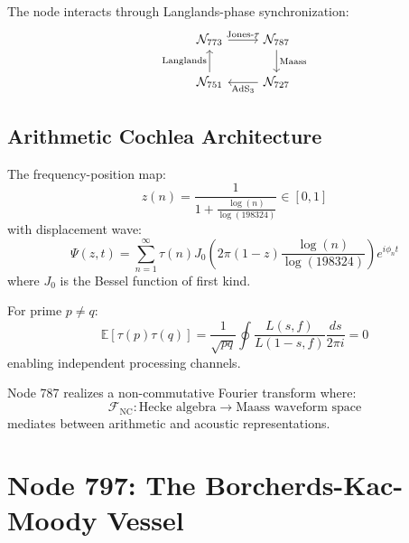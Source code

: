\documentclass[12pt]{article}
\begin{document}
The node interacts through Langlands-phase synchronization:
\begin{equation}
    \begin{tikzcd}
    \mathcal{N}_{773} \arrow[r, "\text{Jones-$\tau$}"] & \mathcal{N}_{787} \arrow[d, "\text{Maass}"] \\
    \mathcal{N}_{751} \arrow[u, "\text{Langlands}"] & \mathcal{N}_{727} \arrow[l, "\text{AdS}_3"] 
    \end{tikzcd}
\end{equation}

\subsection{Arithmetic Cochlea Architecture}

\begin{definition}
The frequency-position map:
\begin{equation}
    z(n) = \frac{1}{1 + \frac{\log(n)}{\log(198324)}} \in [0,1]
\end{equation}
with displacement wave:
\begin{equation}
    \Psi(z,t) = \sum_{n=1}^\infty \tau(n) J_0\left(2\pi (1-z)\frac{\log(n)}{\log(198324)}\right) e^{i\phi_n t}
\end{equation}
where $J_0$ is the Bessel function of first kind.
\end{definition}

\begin{theorem}
For prime $p\neq q$:
\begin{equation}
    \mathbb{E}[\tau(p)\tau(q)] = \frac{1}{\sqrt{pq}} \oint \frac{L(s,f)}{L(1-s,f)} \frac{ds}{2\pi i} = 0
\end{equation}
enabling independent processing channels.
\end{theorem}

\begin{remark}
Node 787 realizes a non-commutative Fourier transform where:
\begin{equation}
    \mathcal{F}_{\text{NC}}: \text{Hecke algebra} \to \text{Maass waveform space}
\end{equation}
mediates between arithmetic and acoustic representations.
\end{remark}

\section{Node 797: The Borcherds-Kac-Moody Vessel}
\label{sec:borcherds_vessel}
\end{document}
